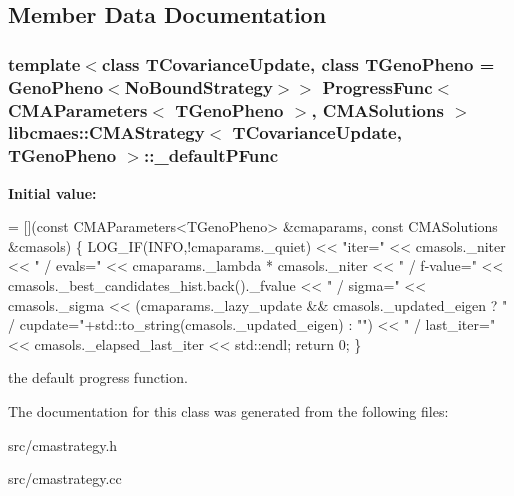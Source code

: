 \subsection{Member Data Documentation}
\hypertarget{classlibcmaes_1_1CMAStrategy_af6d980c670eef47ee810645739999d5b}{
\subsubsection[{\-\_\-default\-P\-Func}]{\setlength{\rightskip}{0pt plus 5cm}template$<$class T\-Covariance\-Update, class T\-Geno\-Pheno = Geno\-Pheno$<$\-No\-Bound\-Strategy$>$$>$ Progress\-Func$<$ {\bf C\-M\-A\-Parameters}$<$ T\-Geno\-Pheno $>$, {\bf C\-M\-A\-Solutions} $>$ {\bf libcmaes\-::\-C\-M\-A\-Strategy}$<$ T\-Covariance\-Update, T\-Geno\-Pheno $>$\-::\-\_\-default\-P\-Func\hspace{0.3cm}{\ttfamily [static]}}}\label{classlibcmaes_1_1CMAStrategy_af6d980c670eef47ee810645739999d5b}
{\bfseries Initial value\-:}
\begin{DoxyCode}
= [](\textcolor{keyword}{const} CMAParameters<TGenoPheno> &cmaparams, \textcolor{keyword}{const} CMASolutions &cmasols)
  \{
    LOG\_IF(INFO,!cmaparams.\_quiet) << \textcolor{stringliteral}{"iter="} << cmasols.\_niter << \textcolor{stringliteral}{" / evals="} << cmaparams.\_lambda * 
      cmasols.\_niter << \textcolor{stringliteral}{" / f-value="} << cmasols.\_best\_candidates\_hist.back().\_fvalue <<  \textcolor{stringliteral}{" / sigma="} << cmasols.\_sigma
       << (cmaparams.\_lazy\_update && cmasols.\_updated\_eigen ? \textcolor{stringliteral}{" / cupdate="}+std::to\_string(cmasols.\_updated\_eigen)
       : \textcolor{stringliteral}{""}) << \textcolor{stringliteral}{" / last\_iter="} << cmasols.\_elapsed\_last\_iter << std::endl;
    \textcolor{keywordflow}{return} 0;
  \}
\end{DoxyCode}
the default progress function. 

The documentation for this class was generated from the following files\-:\begin{DoxyCompactItemize}
\item 
src/cmastrategy.\-h\item 
src/cmastrategy.\-cc\end{DoxyCompactItemize}
